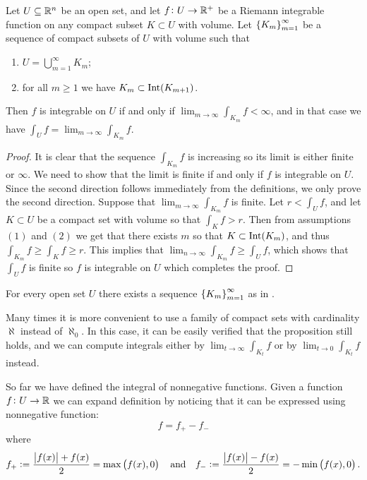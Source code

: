 \documentclass[11pt,a4paper]{article}
\begin{document}
\begin{proposition}[Exhaustion]
  \label{prop:exhaustion}
  Let $U \subseteq \mathbb{R}^n$ be an open set,
  and let $f \colon U \to \mathbb{R}^+$ be a Riemann integrable function
  on any compact subset $K \subset U$ with volume.
  Let $\left\{K_m\right\}_{m=1}^{\infty}$ be a sequence of compact subsets
  of $U$ with volume such that
  \begin{enumerate}
    \item[(1)] $U = \bigcup_{m=1}^{\infty} K_m$;
    \item[(2)] for all $m \geq 1$ we have $K_m \subset \operatorname{Int}(K_{m+1})$.
  \end{enumerate}
  Then $f$ is integrable on $U$ if and only if
  $\lim_{m \to \infty} \int_{K_m} f < \infty$,
  and in that case we have $\int_{U} f = \lim_{m \to \infty} \int_{K_m} f$.
\end{proposition}
\begin{proof}
  It is clear that the sequence $\int_{K_m} f$ is increasing so
  its limit is either finite or $\infty$.
  We need to show that the limit is finite if and only if $f$ is integrable
  on $U$.
  Since the second direction follows immediately from the definitions,
  we only prove the second direction.
  Suppose that $\lim_{m \to \infty} \int_{K_m} f$ is finite.
  Let $r < \int_{U} f$,
  and let $K \subset U$ be a compact set with volume so that $\int_{K} f > r$.
  Then from assumptions $(1)$ and $(2)$ we get that there exists $m$
  so that $K \subset \operatorname{Int}(K_m)$,
  and thus $\int_{K_m} f \geq \int_{K} f \geq r$.
  This implies that $\lim_{n \to \infty} \int_{K_m} f \geq \int_{U} f$,
  which shows that $\int_{U} f$ is finite so $f$ is integrable on $U$
  which completes the proof.
\end{proof}

\begin{remark}
  For every open set $U$ there exists a sequence $\left\{K_m\right\}_{m=1}^{\infty}$
  as in .
\end{remark}
\begin{remark}
  Many times it is more convenient to use a family of compact sets with
  cardinality $\aleph$ instead of $\aleph_0$.
  In this case, it can be easily verified that the proposition still holds, 
  and we can compute integrals either by $\lim_{t \to \infty} \int_{K_t} f$
  or by $\lim_{t \to 0} \int_{K_t} f$ instead.
\end{remark}

\begin{remark}
  So far we have defined the integral of nonnegative functions.
  Given a function $f \colon U \to \mathbb{R}$ we can expand definition
  by noticing that it can be expressed using nonnegative function:
  \[
    f = f_+ - f_-
  \]
  where
  \[
    f_+ := \frac{\abs{f(x)} + f(x)}{2} = \max\pair{f(x),0} \tand
    f_- := \frac{\abs{f(x)} - f(x)}{2} = -\min\pair{f(x),0}.
  \]
\end{remark}
\end{document}
